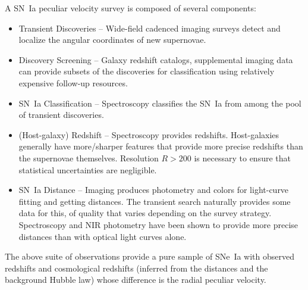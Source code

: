 \documentclass[11pt, oneside]{article}   	%
\begin{document}
A SN~Ia peculiar velocity survey is composed of several components:
\begin{itemize}
\item Transient Discoveries -- Wide-field cadenced imaging surveys detect and localize the angular coordinates of new supernovae.
\item Discovery Screening -- Galaxy redshift catalogs, supplemental imaging data can provide subsets of the discoveries for classification
using relatively expensive follow-up resources.
\item SN~Ia Classification -- Spectroscopy classifies the SN~Ia from among the pool of  transient discoveries. 
\item (Host-galaxy) Redshift -- Spectroscopy provides redshifts. 
Host-galaxies generally have more/sharper features that provide more precise redshifts than the supernovae themselves. Resolution $R>200$
is necessary to ensure that statistical uncertainties are negligible.
\item SN~Ia Distance -- Imaging produces photometry and colors for light-curve fitting and getting distances.  The transient search naturally provides some data
for this, of quality that varies depending on the survey strategy.
Spectroscopy and NIR photometry
have been shown to provide more precise distances than with optical light curves alone.
\end{itemize}
The above suite of observations provide a pure sample of SNe~Ia with observed redshifts and cosmological redshifts (inferred from the distances and
the background Hubble law)
whose difference is the radial peculiar velocity.
\end{document}
